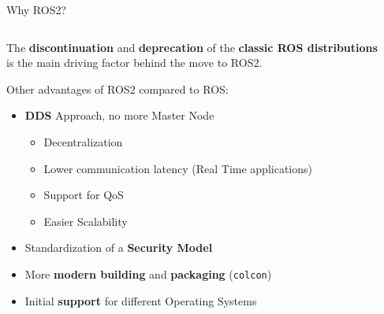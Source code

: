 \begin{frame}{Why ROS2?}
    \begin{columns}
        \begin{column}{.75\linewidth}
            The \textbf{discontinuation} and \textbf{deprecation} of the \textbf{classic ROS distributions} is the main driving factor behind the move to ROS2.

            Other advantages of ROS2 compared to ROS:
            \begin{itemize}
                \item \textbf{DDS} Approach, no more Master Node
                \begin{itemize}
                    \item Decentralization
                    \item Lower communication latency (Real Time applications)
                    \item Support for QoS
                    \item Easier Scalability
                \end{itemize}
                \item Standardization of a \textbf{Security Model}
                \item More \textbf{modern building} and \textbf{packaging} (\texttt{colcon})
                \item Initial \textbf{support} for different Operating Systems
            \end{itemize}
        \end{column}
        \begin{column}{.25\linewidth}
            \begin{center}

\end{center}
\end{column}
\end{columns}
\end{frame}
